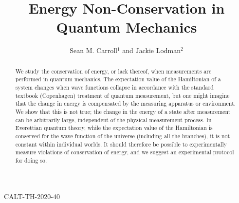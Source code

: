 \documentclass[aps,prd,onecolumn,nofootinbib,notitlepage]{revtex4-1}
\begin{document}
\baselineskip=13pt
\hfill CALT-TH-2020-40
\hfill

\vspace{0.5cm}
\thispagestyle{empty}

\newcommand{\be}{\begin{equation}}
\newcommand{\ee}{\end{equation}}
\newcommand{\bea}{\begin{eqnarray}}
\newcommand{\eea}{\end{eqnarray}}
\newcommand{\hst}{\widetilde{\mathcal{H}}} 
\newcommand{\iso}{\dot{=}}
\newcommand{\Dim}{\mathrm{dim\,}}
\newcommand{\Tr}{\mathrm{Tr}}
\newcommand{\hs}{\mathcal{H}} 
\newcommand{\ham}{\hat{H}}
\newcommand{\intham}{\widehat{H}_{\rm{int}}}
\newcommand{\selfham}{\widehat{H}_{\rm{self}}}
\def\bra#1{\langle #1\rvert}
\def\ket#1{\lvert #1\rangle}
\newcommand{\draftnote}[1]{\textbf{\color{red}[#1]}}
\newcommand{\psiuu}{\psi_{\uparrow\uparrow}}
\newcommand{\psiud}{\psi_{\uparrow\downarrow}}
\newcommand{\psidu}{\psi_{\downarrow\uparrow}}
\newcommand{\psidd}{\psi_{\downarrow\downarrow}}


\title{Energy Non-Conservation in Quantum Mechanics}
\author{Sean M. Carroll$^1$ and Jackie Lodman$^2$}

\begin{abstract}
We study the conservation of energy, or lack thereof, when measurements are performed in quantum mechanics.
The expectation value of the Hamiltonian of a system changes when wave functions collapse in accordance with the standard textbook (Copenhagen) treatment of quantum measurement, but one might imagine that the change in energy is compensated by the measuring apparatus or environment.
We show that this is not true; the change in the energy of a state after measurement can be arbitrarily large, independent of the physical measurement process.
In Everettian quantum theory, while the expectation value of the Hamiltonian is conserved for the wave function of the universe (including all the branches), it is not constant within individual worlds.
It should therefore be possible to experimentally measure violations of conservation of energy, and we suggest an experimental protocol for doing so.
\end{abstract}
\end{document}
